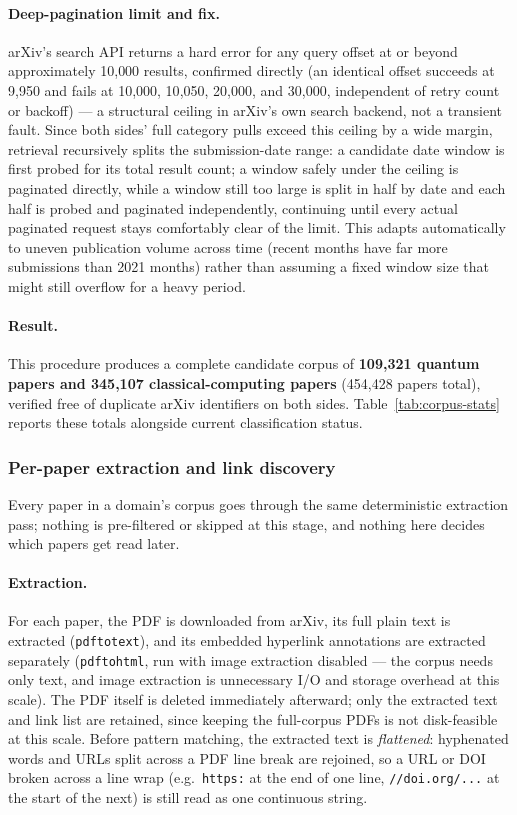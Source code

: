 \paragraph{Deep-pagination limit and fix.} arXiv's search API returns a hard error
for any query offset at or beyond approximately 10{,}000 results, confirmed directly
(an identical offset succeeds at 9{,}950 and fails at 10{,}000, 10{,}050, 20{,}000,
and 30{,}000, independent of retry count or backoff) --- a structural ceiling in
arXiv's own search backend, not a transient fault. Since both sides' full category
pulls exceed this ceiling by a wide margin, retrieval recursively splits the
submission-date range: a candidate date window is first probed for its total result
count; a window safely under the ceiling is paginated directly, while a window still
too large is split in half by date and each half is probed and paginated
independently, continuing until every actual paginated request stays comfortably
clear of the limit. This adapts automatically to uneven publication volume across
time (recent months have far more submissions than 2021 months) rather than assuming
a fixed window size that might still overflow for a heavy period.

\paragraph{Result.} This procedure produces a complete candidate corpus of
\textbf{109{,}321 quantum papers and 345{,}107 classical-computing papers}
(454{,}428 papers total), verified free of duplicate arXiv identifiers on both sides.
Table~\ref{tab:corpus-stats} reports these totals alongside current classification
status.

\subsubsection{Per-paper extraction and link discovery}
\label{sec:candidate-list-gen}

Every paper in a domain's corpus goes through the same deterministic extraction pass;
nothing is pre-filtered or skipped at this stage, and nothing here decides which
papers get read later.

\paragraph{Extraction.} For each paper, the PDF is downloaded from arXiv, its full
plain text is extracted (\texttt{pdftotext}), and its embedded hyperlink annotations
are extracted separately (\texttt{pdftohtml}, run with image extraction disabled ---
the corpus needs only text, and image extraction is unnecessary I/O and storage
overhead at this scale). The PDF itself is deleted immediately afterward; only the
extracted text and link list are retained, since keeping the full-corpus PDFs is not
disk-feasible at this scale. Before pattern matching, the extracted text is
\emph{flattened}: hyphenated words and URLs split across a PDF line break are
rejoined, so a URL or DOI broken across a line wrap (e.g.\ \texttt{https:} at the end
of one line, \texttt{//doi.org/...} at the start of the next) is still read as one
continuous string.

